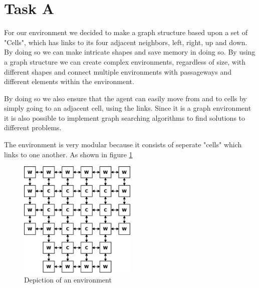 
\section{Task A}
For our environment we decided to make a graph structure based upon a set of
"Cells", which has links to its four adjacent neighbors, left, right, up and 
down. By doing so we can make intricate shapes and save memory in doing so. By
using a graph structure we can create complex environments, regardless of size,
with different shapes and connect multiple environments with passageways and
different elements within the environment.

By doing so we also ensure that the agent can easily move from and to cells by
simply going to an adjacent cell, using the links.  Since it is a graph
environment it is also possible to implement graph searching algorithms to find
solutions to different problems.

The environment is very modular because it consists of seperate "cells" which
links to one another.  As shown in figure \ref{fig:env}

\begin{figure}[h] \label{fig:env}	\centering
\includegraphics[width=0.5\textwidth]{environment}
\caption{Depiction of an environment}
\end{figure}

